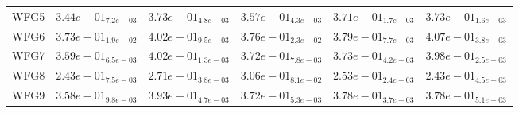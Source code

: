 \documentclass{article}
\begin{document}
\begin{table}
\begin{scriptsize}
\begin{tabular}{llllll}
WFG5 & $  3.44e-01_{ 7.2e-03}$ & \cellcolor{gray95}$  3.73e-01_{ 4.8e-03}$ & $  3.57e-01_{ 4.3e-03}$ & $  3.71e-01_{ 1.7e-03}$ & \cellcolor{gray25}$  3.73e-01_{ 1.6e-03}$ \\
WFG6 & $  3.73e-01_{ 1.9e-02}$ & \cellcolor{gray25}$  4.02e-01_{ 9.5e-03}$ & $  3.76e-01_{ 2.3e-02}$ & $  3.79e-01_{ 7.7e-03}$ & \cellcolor{gray95}$  4.07e-01_{ 3.8e-03}$ \\
WFG7 & $  3.59e-01_{ 6.5e-03}$ & \cellcolor{gray95}$  4.02e-01_{ 1.3e-03}$ & $  3.72e-01_{ 7.8e-03}$ & $  3.73e-01_{ 4.2e-03}$ & \cellcolor{gray25}$  3.98e-01_{ 2.5e-03}$ \\
WFG8 & $  2.43e-01_{ 7.5e-03}$ & \cellcolor{gray25}$  2.71e-01_{ 3.8e-03}$ & \cellcolor{gray95}$  3.06e-01_{ 8.1e-02}$ & $  2.53e-01_{ 2.4e-03}$ & $  2.43e-01_{ 4.5e-03}$ \\
WFG9 & $  3.58e-01_{ 9.8e-03}$ & \cellcolor{gray95}$  3.93e-01_{ 4.7e-03}$ & $  3.72e-01_{ 5.3e-03}$ & \cellcolor{gray25}$  3.78e-01_{ 3.7e-03}$ & $  3.78e-01_{ 5.1e-03}$ \\
\hline
\end{tabular}
\end{scriptsize}
\end{table}
\end{document}
